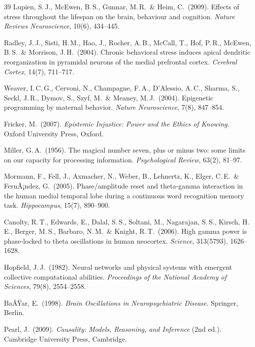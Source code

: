 ﻿\documentclass[12pt,a4paper]{report}
\theoremstyle{plain}
\theoremstyle{definition}
\theoremstyle{remark}
\begin{document}
\begin{thebibliography}{39}
		Lupien, S.\,J., McEwen, B.\,S., Gunnar, M.\,R.\ \& Heim, C.\ (2009).
		Effects of stress throughout the lifespan on the brain, behaviour and cognition.
		\textit{Nature Reviews Neuroscience}, 10(6), 434--445.
		
		Radley, J.\,J., Sisti, H.\,M., Hao, J., Rocher, A.\,B., McCall, T.,
		Hof, P.\,R., McEwen, B.\,S.\ \& Morrison, J.\,H.\ (2004).
		Chronic behavioral stress induces apical dendritic reorganization in
		pyramidal neurons of the medial prefrontal cortex.
		\textit{Cerebral Cortex}, 14(7), 711--717.
		
		Weaver, I.\,C.\,G., Cervoni, N., Champagne, F.\,A., D'Alessio, A.\,C.,
		Sharma, S., Seckl, J.\,R., Dymov, S., Szyf, M.\ \& Meaney, M.\,J.\ (2004).
		Epigenetic programming by maternal behavior.
		\textit{Nature Neuroscience}, 7(8), 847--854.
		
		Fricker, M.\ (2007).
		\textit{Epistemic Injustice: Power and the Ethics of Knowing}.
		Oxford University Press, Oxford.
		
		Miller, G.\,A.\ (1956).
		The magical number seven, plus or minus two: some limits on our capacity
		for processing information.
		\textit{Psychological Review}, 63(2), 81--97.
		
		Mormann, F., Fell, J., Axmacher, N., Weber, B., Lehnertz, K.,
		Elger, C.\,E.\ \& FernÃ¡ndez, G.\ (2005).
		Phase/amplitude reset and theta-gamma interaction in the human medial
		temporal lobe during a continuous word recognition memory task.
		\textit{Hippocampus}, 15(7), 890--900.
		
		Canolty, R.\,T., Edwards, E., Dalal, S.\,S., Soltani, M.,
		Nagarajan, S.\,S., Kirsch, H.\,E., Berger, M.\,S.,
		Barbaro, N.\,M.\ \& Knight, R.\,T.\ (2006).
		High gamma power is phase-locked to theta oscillations in human neocortex.
		\textit{Science}, 313(5793), 1626--1628.
		
		Hopfield, J.\,J.\ (1982).
		Neural networks and physical systems with emergent collective
		computational abilities.
		\textit{Proceedings of the National Academy of Sciences}, 79(8), 2554--2558.
		
		BaÅŸar, E.\ (1998).
		\textit{Brain Oscillations in Neuropsychiatric Disease}.
		Springer, Berlin.
		
		Pearl, J.\ (2009).
		\textit{Causality: Models, Reasoning, and Inference} (2nd ed.).
		Cambridge University Press, Cambridge.
		

\end{thebibliography}
\end{document}
